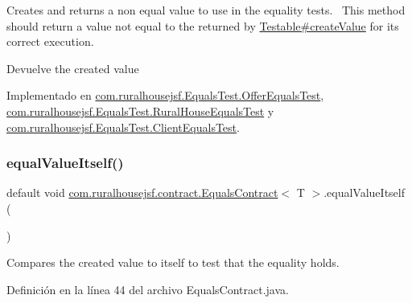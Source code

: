 Creates and returns a non equal value to use in the equality tests.~\newline
 This method should return a value not equal to the returned by \mbox{\hyperlink{interfacecom_1_1ruralhousejsf_1_1contract_1_1_testable_ae4546a381488faaba1ef7c0f8688de9c}{Testable\#create\+Value}} for its correct execution.

\begin{DoxyReturn}{Devuelve}
the created value 
\end{DoxyReturn}


Implementado en \mbox{\hyperlink{classcom_1_1ruralhousejsf_1_1_equals_test_1_1_offer_equals_test_a459de0dbb86bdaa6f54b99eb887a2eab}{com.\+ruralhousejsf.\+Equals\+Test.\+Offer\+Equals\+Test}}, \mbox{\hyperlink{classcom_1_1ruralhousejsf_1_1_equals_test_1_1_rural_house_equals_test_a4021dc1a2dacaed55fa5bacec7ca6165}{com.\+ruralhousejsf.\+Equals\+Test.\+Rural\+House\+Equals\+Test}} y \mbox{\hyperlink{classcom_1_1ruralhousejsf_1_1_equals_test_1_1_client_equals_test_a25218bb97f8e3d88b9dd7e13afd0a6ed}{com.\+ruralhousejsf.\+Equals\+Test.\+Client\+Equals\+Test}}.

\mbox{\label{interfacecom_1_1ruralhousejsf_1_1contract_1_1_equals_contract_a5daf9e73e1147c8765c0fcf3d3dddbb0}} 
\subsubsection{\texorpdfstring{equalValueItself()}{equalValueItself()}}
{\footnotesize\ttfamily default void \mbox{\hyperlink{interfacecom_1_1ruralhousejsf_1_1contract_1_1_equals_contract}{com.\+ruralhousejsf.\+contract.\+Equals\+Contract}}$<$ T $>$.equal\+Value\+Itself (\begin{DoxyParamCaption}{ }\end{DoxyParamCaption})}

Compares the created value to itself to test that the equality holds. 

Definición en la línea 44 del archivo Equals\+Contract.\+java.

\mbox{\label{interfacecom_1_1ruralhousejsf_1_1contract_1_1_equals_contract_acaa5c1c071bf63a3e629977c73131fc8}} 
